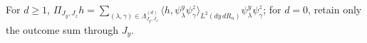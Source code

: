 For \(d\ge1\), \(\Pi_{J_y,J_z}h=\sum_{(\lambda,\gamma)\in\Lambda_{J_y,J_z}^{(d)}}\langle h,\psi^y_\lambda\psi^z_\gamma\rangle_{L^2(dy\,dR_n)}\psi^y_\lambda\psi^z_\gamma\); for \(d=0\), retain only the outcome sum through \(J_y\).